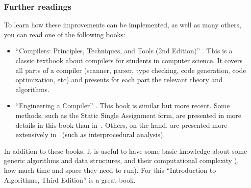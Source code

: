 \subsubsection{Further readings}

To learn how these improvements can be implemented, as well as many others, you
can read one of the following books:
\begin{itemize}
  \item ``Compilers: Principles, Techniques, and Tools (2nd Edition)''
  \cite{CompilersPrinciples}. This is a classic textbook about compilers for
  students in computer science. It covers all parts of a compiler (scanner,
  parser, type checking, code generation, code optimization, etc) and presents
  for each part the relevant theory and algorithms.

  \item ``Engineering a Compiler'' \cite{EngineeringCompiler}. This book is
  similar but more recent. Some methods, such as the Static Single Assignment
  form, are presented in more details in this book than
  in~\cite{CompilersPrinciples}. Others, on the hand, are presented more
  extensively in~\cite{CompilersPrinciples} (such as interprocedural analysis).
\end{itemize}

In addition to these books, it is useful to have some basic knowledge about
some generic algorithms and data structures, and their computational complexity
(\ie, how much time and space they need to run). For this ``Introduction to
Algorithms, Third Edition'' \cite{IntroductionToAlgorithms} is a great book.